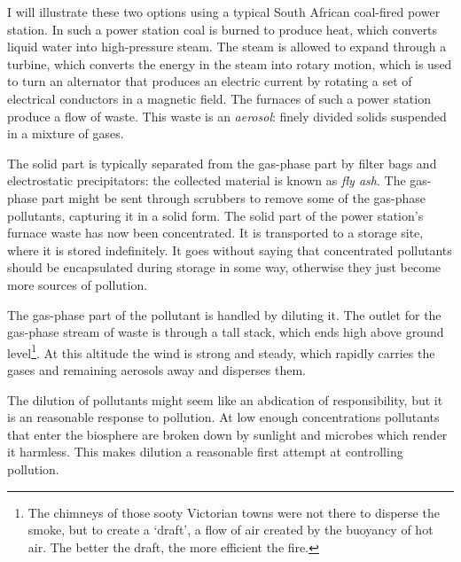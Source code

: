 
I will illu\-strate these two options using a typical South Afri\-can coal-fired
pow\-er sta\-tion. In such a power station coal is burned to produce heat, which
converts liquid water into high-pressure steam. The steam is allowed to expand
through a turbine, which converts the energy in the steam into rotary motion,
which is used to turn an alternator that produces an electric current by
rotating a set of electrical conductors in a magnetic field. The furnaces of
such a power station produce a flow of waste. This waste is an \textit{aerosol}:
finely divided solids suspended in a mixture of gases. 

The solid part is typically separated from the gas-phase part by filter bags and
electrostatic precipitators: the collected material is known as \textit{fly
ash}. The gas-phase part might be sent through scrubbers to remove some of the
gas-phase pollutants, capturing it in a solid form. The solid part of the power
station's furnace waste has now been concentrated. It is transported to a
storage site, where it is stored indefinitely. It goes without saying that
concentrated pollutants should be encapsulated during storage in some way,
otherwise they just become more sources of pollution.

The gas-phase part of the pollutant is handled by diluting it. The outlet for
the gas-phase stream of waste is through a tall stack, which ends high above
ground level\footnote{The chimneys of those sooty Victorian towns were not there
to disperse the smoke, but to create a `draft', a flow of air created by the
buoyancy of hot air. The better the draft, the more efficient the fire.}. At
this altitude the wind is strong and steady, which rapidly carries the gases and
remaining aerosols away and disperses them.

The dilution of pollutants might seem like an abdication of responsibility, but
it is an reasonable response to pollution. At low enough concentrations
pollutants that enter the biosphere are broken down by sunlight and microbes
which render it harmless. This makes dilution a reasonable first attempt at
controlling pollution.

